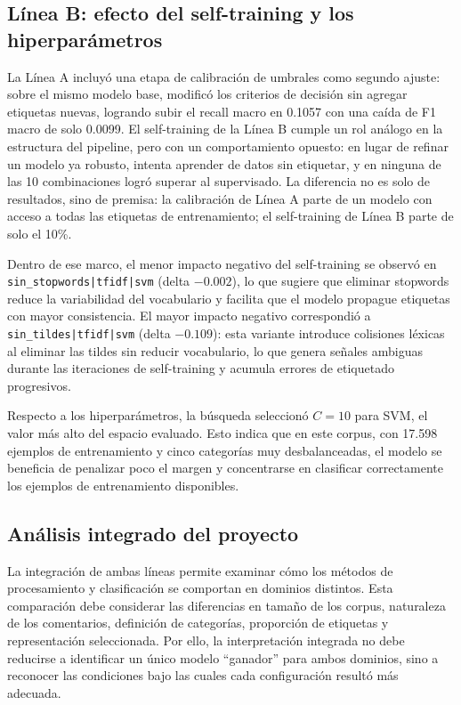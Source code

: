 \documentclass[12pt,a4paper]{article}
\newcommand{\code}[1]{\nolinkurl{#1}}
\begin{document}
\subsection{Línea B: efecto del self-training y los hiperparámetros}

La Línea A incluyó una etapa de calibración de umbrales como segundo ajuste: sobre el mismo modelo base, modificó los criterios de decisión sin agregar etiquetas nuevas, logrando subir el recall macro en 0.1057 con una caída de F1 macro de solo 0.0099. El self-training de la Línea B cumple un rol análogo en la estructura del pipeline, pero con un comportamiento opuesto: en lugar de refinar un modelo ya robusto, intenta aprender de datos sin etiquetar, y en ninguna de las 10 combinaciones logró superar al supervisado. La diferencia no es solo de resultados, sino de premisa: la calibración de Línea A parte de un modelo con acceso a todas las etiquetas de entrenamiento; el self-training de Línea B parte de solo el 10\%.

Dentro de ese marco, el menor impacto negativo del self-training se observó en \code{sin\_stopwords|tfidf|svm} (delta $-0.002$), lo que sugiere que eliminar stopwords reduce la variabilidad del vocabulario y facilita que el modelo propague etiquetas con mayor consistencia. El mayor impacto negativo correspondió a \code{sin\_tildes|tfidf|svm} (delta $-0.109$): esta variante introduce colisiones léxicas al eliminar las tildes sin reducir vocabulario, lo que genera señales ambiguas durante las iteraciones de self-training y acumula errores de etiquetado progresivos.

Respecto a los hiperparámetros, la búsqueda seleccionó $C=10$ para SVM, el valor más alto del espacio evaluado. Esto indica que en este corpus, con 17.598 ejemplos de entrenamiento y cinco categorías muy desbalanceadas, el modelo se beneficia de penalizar poco el margen y concentrarse en clasificar correctamente los ejemplos de entrenamiento disponibles.

\subsection{Análisis integrado del proyecto}

La integración de ambas líneas permite examinar cómo los métodos de procesamiento y clasificación se comportan en dominios distintos. Esta comparación debe considerar las diferencias en tamaño de los corpus, naturaleza de los comentarios, definición de categorías, proporción de etiquetas y representación seleccionada. Por ello, la interpretación integrada no debe reducirse a identificar un único modelo ``ganador'' para ambos dominios, sino a reconocer las condiciones bajo las cuales cada configuración resultó más adecuada.
\end{document}
